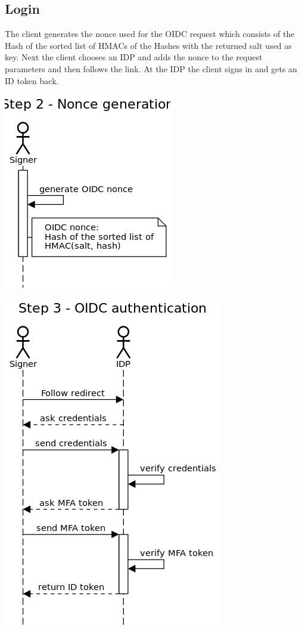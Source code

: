\subsection{Login}
The client generates the nonce used for the \gls{OIDC} request which consists of the Hash of the sorted list of \gls{HMAC}s of the Hashes with the returned salt used as key. 
Next the client chooses an \gls{IDP} and adds the nonce to the request parameters and then follows the link. At the \gls{IDP} the client signs in and gets an ID token back.

\includegraphics[scale=0.5]{images/protocol_step2_nonce_generation.png}

\includegraphics[scale=0.5]{images/protocol_step3_oidc_authentication.png}


